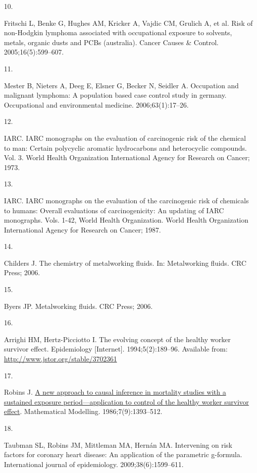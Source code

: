 \documentclass[
  11pt,
  letterpaper,
  DIV=11,
  numbers=noendperiod]{scrartcl}
\newlength{\cslhangindent}
\newlength{\csllabelwidth}
\newenvironment{CSLReferences}[2] %
 {\begin{list}{}{%
  \setlength{\itemindent}{0pt}
  \setlength{\leftmargin}{0pt}
  \setlength{\parsep}{0pt}
  \ifodd #1
   \setlength{\leftmargin}{\cslhangindent}
   \setlength{\itemindent}{-1\cslhangindent}
  \fi
  \setlength{\itemsep}{#2\baselineskip}}}
 {\end{list}}
\newcommand{\CSLLeftMargin}[1]{\parbox[t]{\csllabelwidth}{\strut#1\strut}}
\newcommand{\CSLRightInline}[1]{\parbox[t]{\linewidth - \csllabelwidth}{\strut#1\strut}}
\begin{document}
\begin{CSLReferences}{1}{0}
\CSLLeftMargin{10. }%
\CSLRightInline{Fritschi L, Benke G, Hughes AM, Kricker A, Vajdic CM,
Grulich A, et al. Risk of non-{Hodgkin} lymphoma associated with
occupational exposure to solvents, metals, organic dusts and PCBs
(australia). Cancer Causes \& Control. 2005;16(5):599--607. }

\CSLLeftMargin{11. }%
\CSLRightInline{Mester B, Nieters A, Deeg E, Elsner G, Becker N, Seidler
A. Occupation and malignant lymphoma: A population based case control
study in germany. Occupational and environmental medicine.
2006;63(1):17--26. }

\CSLLeftMargin{12. }%
\CSLRightInline{IARC. IARC monographs on the evaluation of carcinogenic
risk of the chemical to man: Certain polycyclic aromatic hydrocarbons
and heterocyclic compounds. Vol. 3. World Health Organization
International Agency for Research on Cancer; 1973. }

\CSLLeftMargin{13. }%
\CSLRightInline{IARC. IARC monographs on the evaluation of the
carcinogenic risk of chemicals to humans: Overall evaluations of
carcinogenicity: An updating of IARC monographs. Vols. 1-42, World
Health Organization. World Health Organization International Agency for
Research on Cancer; 1987. }

\CSLLeftMargin{14. }%
\CSLRightInline{Childers J. The chemistry of metalworking fluids. In:
Metalworking fluids. CRC Press; 2006. }

\CSLLeftMargin{15. }%
\CSLRightInline{Byers JP. Metalworking fluids. CRC Press; 2006. }

\CSLLeftMargin{16. }%
\CSLRightInline{Arrighi HM, Hertz-Picciotto I. The evolving concept of
the healthy worker survivor effect. Epidemiology {[}Internet{]}.
1994;5(2):189--96. Available from:
\url{http://www.jstor.org/stable/3702361}}

\CSLLeftMargin{17. }%
\CSLRightInline{Robins J.
\href{https://doi.org/10.1016/0270-0255(86)90088-6}{A new approach to
causal inference in mortality studies with a sustained exposure
period---application to control of the healthy worker survivor effect}.
Mathematical Modelling. 1986;7(9):1393--512. }

\CSLLeftMargin{18. }%
\CSLRightInline{Taubman SL, Robins JM, Mittleman MA, Hernán MA.
Intervening on risk factors for coronary heart disease: An application
of the parametric g-formula. International journal of epidemiology.
2009;38(6):1599--611. }


\end{CSLReferences}
\end{document}
